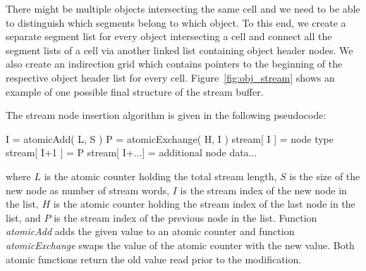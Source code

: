 \documentclass[11pt,a4paper,twoside]{article}
\newenvironment {code}{\footnotesize}{\normalsize}
\begin{document}
There might be multiple objects intersecting the same cell and we need to be able to distinguish which segments belong to which object. To this end, we create a separate segment list for every object intersecting a cell and connect all the segment lists of a cell via another linked list containing object header nodes. We also create an indirection grid which contains pointers to the beginning of the respective object header list for every cell. Figure~\ref{fig:obj_stream} shows an example of one possible final structure of the stream buffer.



The stream node insertion algorithm is given in the following pseudocode:
\begin{verbatimtab}[3]
				I = atomicAdd( L, S )
				P = atomicExchange( H, I )
				stream[ I ] = node type
				stream[ I+1 ] = P
				stream[ I+...] = additional node data...
\end{verbatimtab}
where $L$ is the atomic counter holding the total stream length, $S$ is the size of the new node as number of stream words, $I$ is the stream index of the new node in the list, $H$ is the atomic counter holding the stream index of the last node in the list, and $P$ is the stream index of the previous node in the list. Function \emph{atomicAdd} adds the given value to an atomic counter and function \emph{atomicExchange} swaps the value of the atomic counter with the new value. Both atomic functions return the old value read prior to the modification.
\end{document}
